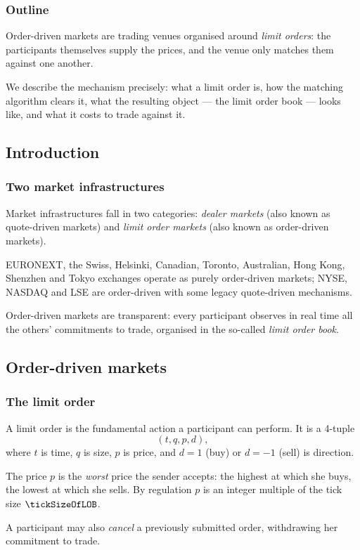 \begin{frame}
  \frametitle{Outline}
\nocite{FPR13mar}
\nocite{GPWMFH13lim}
\nocite{CDJ18enh}
Order-driven markets are trading venues organised around \emph{limit orders}:
the participants themselves supply the prices,
and the venue only matches them against one another.

We describe the mechanism precisely:
what a limit order is,
how the matching algorithm clears it,
what the resulting object --- the limit order book --- looks like,
and what it costs to trade against it.
\end{frame}

\subsection{Introduction}

\begin{frame}
  \frametitle{Two market infrastructures}
Market infrastructures fall in two categories:
\emph{dealer markets} (also known as quote-driven markets)
and
\emph{limit order markets} (also known as order-driven markets).

\pause

EURONEXT, the Swiss, Helsinki, Canadian, Toronto, Australian, Hong Kong, Shenzhen and Tokyo
exchanges operate as purely order-driven markets;
NYSE, NASDAQ and LSE are order-driven with some legacy quote-driven mechanisms.

\pause

Order-driven markets are transparent:
every participant observes in real time all the others' commitments to trade,
organised in the so-called \emph{limit order book}.
\end{frame}

\subsection{Order-driven markets}

\begin{frame}
  \frametitle{The limit order}
A limit order is the fundamental action a participant can perform.
It is a 4-tuple
\[
(t,q,p,d),
\]
where $t$ is time, $q$ is size, $p$ is price,
and $d=1$ (buy) or $d=-1$ (sell) is direction.

\pause

The price $p$ is the \emph{worst} price the sender accepts:
the highest at which she buys, the lowest at which she sells.
By regulation $p$ is an integer multiple of the tick size $\tickSizeOfLOB$.

\pause

A participant may also \emph{cancel} a previously submitted order,
withdrawing her commitment to trade.
\end{frame}

